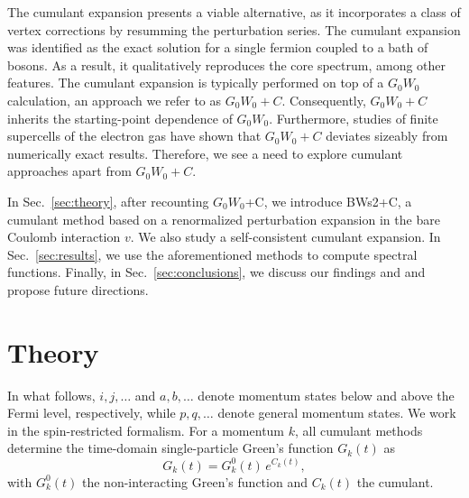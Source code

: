 \documentclass[%
 reprint,
 amsmath,amssymb,
 aps,
]{revtex4-2}
\begin{document}
The cumulant expansion presents a viable alternative, as it incorporates a class of vertex corrections by resumming the perturbation series. The cumulant expansion was identified as the exact solution for a single fermion coupled to a bath of bosons. As a result, it qualitatively reproduces the core spectrum, among other features. The cumulant expansion is typically performed on top of a $G_0W_0$ calculation, an approach we refer to as $G_0W_0+C$. Consequently, $G_0W_0+C$ inherits the starting-point dependence of $G_0W_0$. Furthermore, studies of finite supercells of the electron gas have shown that $G_0W_0+C$ deviates sizeably from numerically exact results. Therefore, we see a need to explore cumulant approaches apart from $G_0W_0+C$. 


In Sec.~\ref{sec:theory}, after recounting $G_0W_0$+C, we introduce BWs2+C, a cumulant method based on a renormalized perturbation expansion in the bare Coulomb interaction $v$. We also study a self-consistent cumulant expansion.
In Sec.~\ref{sec:results}, we use the aforementioned methods to compute spectral functions. Finally, in Sec.~\ref{sec:conclusions}, we discuss our findings and and propose future directions.

\section{Theory}
In what follows, $i,j,\ldots$ and $a,b,\ldots$ denote momentum states below and above the Fermi level, respectively, while $p,q,\ldots$ denote general momentum states. We work in the spin-restricted formalism. For a momentum $k$, all
cumulant methods determine the time-domain single-particle Green's function $G_k(t)$ as 
\label{sec:theory}
\begin{equation}
G_k(t) = G_k^{0}(t)\, e^{C_k(t)},
\label{eq:cumulant}
\end{equation}
with $G_k^{0}(t)$ the non-interacting Green's function and $C_k(t)$ the cumulant. 
\end{document}
